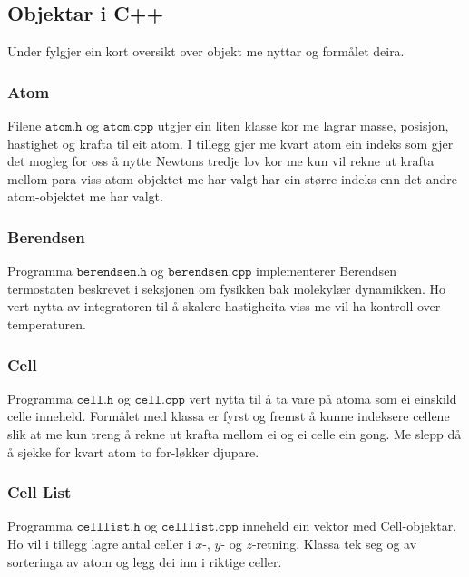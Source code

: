 \documentclass[12pt, a4paper]{article}
\theoremstyle{definition}
\begin{document}
    \subsection*{Objektar i C++}
        Under fylgjer ein kort oversikt over objekt me nyttar og formålet deira.

        \subsubsection*{Atom}
            Filene $\texttt{atom.h}$ og $\texttt{atom.cpp}$ utgjer ein liten klasse kor me lagrar masse, posisjon, hastighet og krafta til eit atom. I tillegg 
            gjer me kvart atom ein indeks som gjer det mogleg for oss å nytte Newtons tredje lov kor me kun vil rekne ut krafta mellom para viss atom-objektet me
            har valgt har ein større indeks enn det andre atom-objektet me har valgt.

        \subsubsection*{Berendsen}
            Programma $\texttt{berendsen.h}$ og $\texttt{berendsen.cpp}$ implementerer Berendsen termostaten beskrevet i seksjonen om fysikken bak molekylær dynamikken.
            Ho vert nytta av integratoren til å skalere hastigheita viss me vil ha kontroll over temperaturen.

        \subsubsection*{Cell}
            Programma $\texttt{cell.h}$ og $\texttt{cell.cpp}$ vert nytta til å ta vare på atoma som ei einskild celle inneheld. Formålet med klassa er fyrst og fremst
            å kunne indeksere cellene slik at me kun treng å rekne ut krafta mellom ei og ei celle ein gong. Me slepp då å sjekke for kvart atom to for-løkker djupare.

        \subsubsection*{Cell List}
            Programma $\texttt{celllist.h}$ og $\texttt{celllist.cpp}$ inneheld ein vektor med Cell-objektar. Ho vil i tillegg lagre antal celler i $x$-, $y$- og $z$-retning.
            Klassa tek seg og av sorteringa av atom og legg dei inn i riktige celler.
\end{document}
